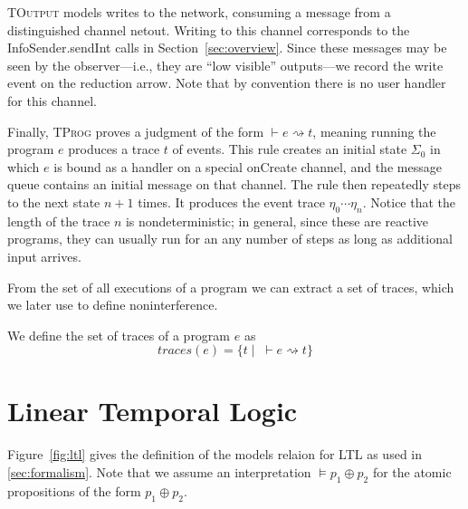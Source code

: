 \documentclass{llncs}
\newcommand{\code}[1]{\textsf{#1}} \newcommand{\bcode}[1]{\texttt{#1}}
\newcommand{\aset}[1]{\{#1\}}
\newcommand{\sfmt}[1]{\textsf{#1}}
\newcommand{\judge}{\vdash}
\newcommand{\traces}{\textit{traces}}
\begin{document}
\textsc{TOutput} models writes to the network, consuming a message
from a distinguished channel \sfmt{netout}. Writing to this channel
corresponds to the \code{InfoSender.sendInt} calls in
Section~\ref{sec:overview}. Since these messages may be seen by the
observer---i.e., they are ``low visible'' outputs---we record the
write event on the reduction arrow. Note that by convention
there is no user handler for this channel.

Finally, \textsc{TProg} proves a judgment of the form
$\judge e \rightsquigarrow t$, meaning running the program $e$ produces a
trace $t$ of events.
This rule creates an initial state $\Sigma_0$ in
which $e$ is bound as a handler on a special \code{onCreate} channel,
and the message queue contains an initial message on that channel. The
rule then repeatedly steps to the next state $n+1$ times. It produces 
the event trace $\eta_0\cdots\eta_n$.
Notice that the length of the trace $n$ is nondeterministic; in general,
since these are reactive programs, they can usually run for an any
number of steps as long as additional input arrives.

From the set of all executions of a program we can extract a set of
traces, which we later use to define noninterference.
\begin{definition}
  We define the set of traces of a program $e$ as
\begin{displaymath}
  \traces(e) = \aset{t \mid \; \judge e { \rightsquigarrow t }}
\end{displaymath}
\end{definition}


\section{Linear Temporal Logic}
\label{sec:ltl}

Figure~\ref{fig:ltl} gives the definition of the models relaion for
LTL as used in \ref{sec:formalism}.  Note that we assume an
interpretation $\models p_1 \oplus p_2$ for the atomic propositions of
the form $p_1 \oplus p_2$.
\end{document}
